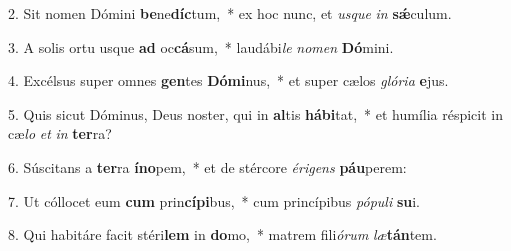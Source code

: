 2. Sit nomen Dómini \textbf{be}ne\textbf{díc}tum,~*  ex hoc nunc, et \textit{us}\textit{que} \textit{in} \textbf{sǽ}culum.\

3. A solis ortu usque \textbf{ad} oc\textbf{cá}sum,~*  laudábi\textit{le} \textit{no}\textit{men} \textbf{Dó}mini.\

4. Excélsus super omnes \textbf{gen}tes \textbf{Dó}\textbf{mi}nus,~*  et super cælos \textit{gló}\textit{ri}\textit{a} \textbf{e}jus.\

5. Quis sicut Dóminus, Deus noster, qui in \textbf{al}tis \textbf{há}\textbf{bi}tat,~*  et humília réspicit in cæ\textit{lo} \textit{et} \textit{in} \textbf{ter}ra?\

6. Súscitans a \textbf{ter}ra \textbf{ín}\textbf{o}pem,~*  et de stércore \textit{é}\textit{ri}\textit{gens} \textbf{páu}perem:\

7. Ut cóllocet eum \textbf{cum} prin\textbf{cí}\textbf{pi}bus,~*  cum princípibus \textit{pó}\textit{pu}\textit{li} \textbf{su}i.\

8. Qui habitáre facit stéri\textbf{lem} in \textbf{do}mo,~*  matrem fili\textit{ó}\textit{rum} \textit{læ}\textbf{tán}tem.\

